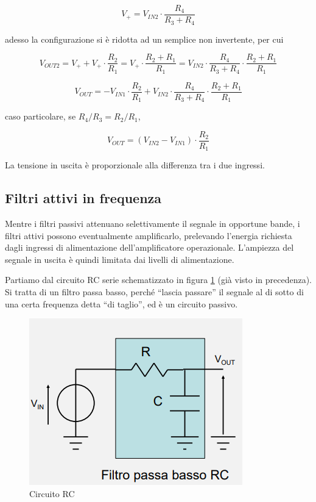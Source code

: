 \documentclass{article}
\begin{document}
\[V_+ = V_{IN2} \cdot \frac{R_4}{R_3 + R_4}\]

adesso la configurazione si è ridotta ad un semplice non invertente, per cui

\[V_{OUT2} = V_+ + V_+ \cdot \frac{R_2}{R_1} = V_+ \cdot \frac{R_2 + R_1}{R_1} = V_{IN2} \cdot \frac{R_4}{R_3 + R_4} \cdot \frac{R_2 + R_1}{R_1}\]

\[V_{OUT} = - V_{IN1} \cdot \frac{R_2}{R_1} + V_{IN2} \cdot \frac{R_4}{R_3 + R_4} \cdot \frac{R_2 + R_1}{R_1}\]

caso particolare, se $R_4 / R_3 = R_2 / R_1$,

\[V_{OUT} = (V_{IN2} - V_{IN1}) \cdot \frac{R_2}{R_1}\]

La tensione in uscita è proporzionale alla differenza tra i due ingressi.









\clearpage
\subsection{Filtri attivi in frequenza}

Mentre i filtri passivi attenuano selettivamente il segnale in opportune bande, i filtri attivi possono eventualmente amplificarlo, prelevando l'energia richiesta dagli ingressi di alimentazione dell'amplificatore operazionale. L'ampiezza del segnale in uscita è quindi limitata dai livelli di alimentazione.

\vspace{3mm}

Partiamo dal circuito RC serie schematizzato in figura \ref{Schema_circuito_RC_passivo_bis} (già visto in precedenza). Si tratta di un filtro passa basso, perché ``lascia passare'' il segnale al di sotto di una certa frequenza detta ``di taglio'', ed è un circuito passivo.

\begin{figure}[h]
  \centering
  \includegraphics[scale=0.6]{IM_circuito_RC_passivo}
  \caption{Circuito RC}
  \label{Schema_circuito_RC_passivo_bis}
\end{figure}
\end{document}
